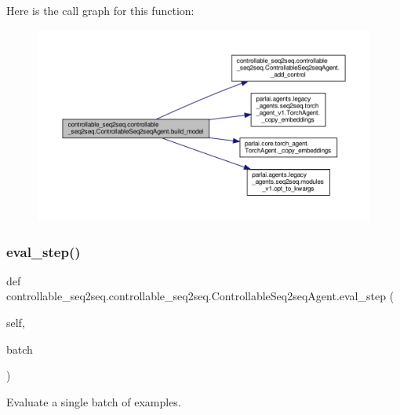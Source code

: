 Here is the call graph for this function\+:
\nopagebreak
\begin{figure}[H]
\begin{center}
\leavevmode
\includegraphics[width=350pt]{classcontrollable__seq2seq_1_1controllable__seq2seq_1_1ControllableSeq2seqAgent_a7341b7dedc7150c4dfa27254188360c1_cgraph}
\end{center}
\end{figure}
\mbox{\label{classcontrollable__seq2seq_1_1controllable__seq2seq_1_1ControllableSeq2seqAgent_a600aa2aca5941966727a8e02bb0430a3}} 
\subsubsection{\texorpdfstring{eval\+\_\+step()}{eval\_step()}}
{\footnotesize\ttfamily def controllable\+\_\+seq2seq.\+controllable\+\_\+seq2seq.\+Controllable\+Seq2seq\+Agent.\+eval\+\_\+step (\begin{DoxyParamCaption}\item[{}]{self,  }\item[{}]{batch }\end{DoxyParamCaption})}

\begin{DoxyVerb}Evaluate a single batch of examples.\end{DoxyVerb}
 

